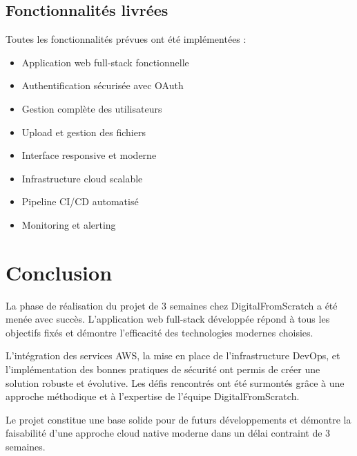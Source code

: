 \subsection{Fonctionnalités livrées}

Toutes les fonctionnalités prévues ont été implémentées :

\begin{itemize}
    \item Application web full-stack fonctionnelle
    \item Authentification sécurisée avec OAuth
    \item Gestion complète des utilisateurs
    \item Upload et gestion des fichiers
    \item Interface responsive et moderne
    \item Infrastructure cloud scalable
    \item Pipeline CI/CD automatisé
    \item Monitoring et alerting
\end{itemize}

\section{Conclusion}

La phase de réalisation du projet de 3 semaines chez DigitalFromScratch a été menée avec succès. L'application web full-stack développée répond à tous les objectifs fixés et démontre l'efficacité des technologies modernes choisies.

L'intégration des services AWS, la mise en place de l'infrastructure DevOps, et l'implémentation des bonnes pratiques de sécurité ont permis de créer une solution robuste et évolutive. Les défis rencontrés ont été surmontés grâce à une approche méthodique et à l'expertise de l'équipe DigitalFromScratch.

Le projet constitue une base solide pour de futurs développements et démontre la faisabilité d'une approche cloud native moderne dans un délai contraint de 3 semaines. 